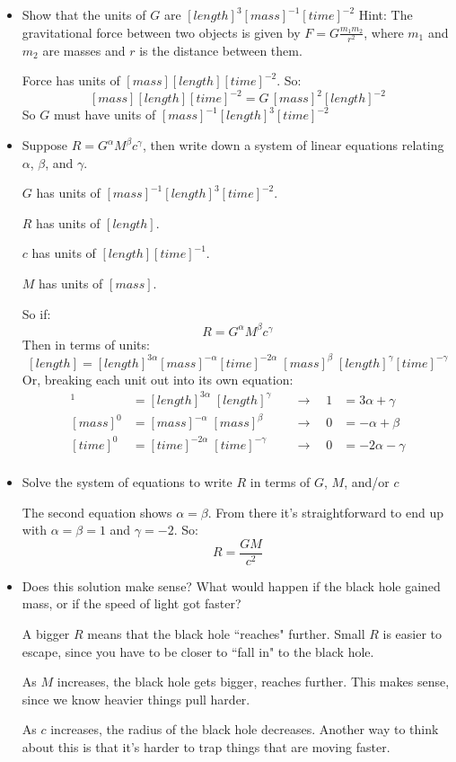 \documentclass{article}
\newcommand{\purple}[1]{{\color{purple} #1}}
\begin{document}
\begin{itemize}
    \item Show that the units of $G$ are $[length]^3 [mass]^{-1} [time]^{-2}$
    Hint: The gravitational force between two objects is given by $F = G\frac{m_1 m_2}{r^2}$, where $m_1$ and $m_2$ are masses and $r$ is the distance between them.
    
    \purple{
    Force has units of $[mass][length][time]^{-2}$. So:
    $$
    [mass][length][time]^{-2} = G \, [mass]^2 [length]^{-2}
    $$
    So $G$ must have units of $[mass]^{-1} [length]^{3} [time]^{-2}$
    }
    \item Suppose $R = G^{\alpha} M^{\beta} c^{\gamma}$, then write down a system of linear equations relating $\alpha$, $\beta$, and $\gamma$. 
    
    \purple{
    $G$ has units of $[mass]^{-1} [length]^{3} [time]^{-2}$.
    
    $R$ has units of $[length]$.
    
    $c$ has units of $[length][time]^{-1}$.
    
    $M$ has units of $[mass]$. 
    
    So if:
    $$
    R = G^\alpha M^\beta c^\gamma
    $$
    Then in terms of units:
    $$
    [length] = [length]^{3\alpha} [mass]^{-\alpha} [time]^{-2\alpha} \; [mass]^\beta \; [length]^\gamma [time]^{-\gamma}
    $$
    Or, breaking each unit out into its own equation:
    \begin{align*}
        [length]^{1} &= [length]^{3 \alpha} \; [length]^{\gamma} \quad &\rightarrow \quad 1 &= 3\alpha + \gamma \\
        [mass]^0 &= [mass]^{-\alpha} \; [mass]^\beta \quad &\rightarrow \quad 0 &= -\alpha + \beta \\
        [time]^0 &= [time]^{-2\alpha} \; [time]^{-\gamma} \quad &\rightarrow \quad 0 &= -2\alpha - \gamma \\
    \end{align*}
    }    
    \item Solve the system of equations to write $R$ in terms of $G$, $M$, and/or $c$
    
    \purple{
    The second equation shows $\alpha=\beta$. From there it's straightforward to end up with $\alpha=\beta=1$ and $\gamma=-2$. So:
    $$
    R = \frac{GM}{c^2} 
    $$
    }
    \item Does this solution make sense? What would happen if the black hole gained mass, or if the speed of light got faster?
    
    \purple{
    A bigger $R$ means that the black hole ``reaches" further. Small $R$ is easier to escape, since you have to be closer to ``fall in" to the black hole.
    
    As $M$ increases, the black hole gets bigger, reaches further. This makes sense, since we know heavier things pull harder.
    
    As $c$ increases, the radius of the black hole decreases. Another way to think about this is that it's harder to trap things that are moving faster.
    }
\end{itemize}
\end{document}

